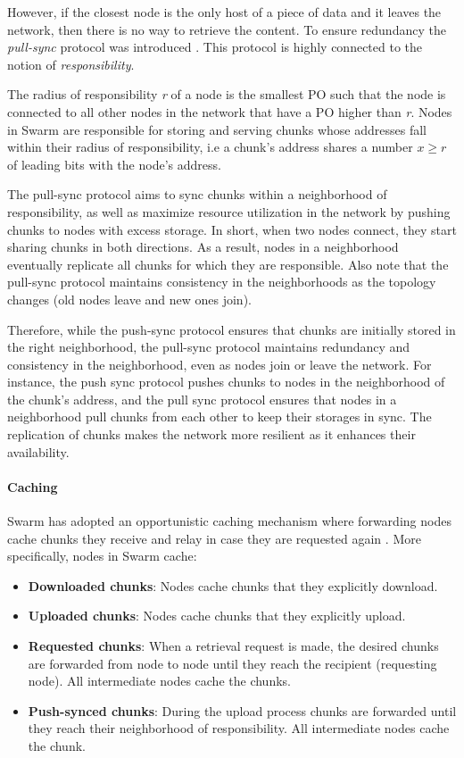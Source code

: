 However, if the closest node is the only host of a piece of data and it leaves the network, then there is no way to retrieve the content. To ensure redundancy the \textit{pull-sync} protocol was introduced \citep{swarm_team_2021}. This protocol is highly connected to the notion of \textit{responsibility}.

The radius of responsibility \textit{r} of a node is the smallest PO such that the node is connected to all other nodes in the network that have a PO higher than \textit{r}. Nodes in Swarm are responsible for storing and serving chunks whose addresses fall within their radius of responsibility, i.e a chunk's address shares a number $x \geq r$ of leading bits with the node's address.

The pull-sync protocol aims to sync chunks within a neighborhood of responsibility, as well as maximize resource utilization in the network by pushing chunks to nodes with excess storage. In short, when two nodes connect, they start sharing chunks in both directions. As a result, nodes in a neighborhood eventually replicate all chunks for which they are responsible. Also note that the pull-sync protocol maintains consistency in the neighborhoods as the topology changes (old nodes leave and new ones join).

Therefore, while the push-sync protocol ensures that chunks are initially stored in the right neighborhood, the pull-sync protocol maintains redundancy and consistency in the neighborhood, even as nodes join or leave the network. For instance, the push sync protocol pushes chunks to nodes in the neighborhood of the chunk's address, and the pull sync protocol ensures that nodes in a neighborhood pull chunks from each other to keep their storages in sync. The replication of chunks makes the network more resilient as it enhances their availability.

\paragraph{Caching}\label{par:caching_swarm}
Swarm has adopted an opportunistic caching mechanism where forwarding nodes cache chunks they receive and relay in case they are requested again \citep[p.~47]{tron_2020}. More specifically, nodes in Swarm cache:

\begin{itemize}
    \item \textbf{Downloaded chunks}: Nodes cache chunks that they explicitly download.
    \item \textbf{Uploaded chunks}: Nodes cache chunks that they explicitly upload.
    \item \textbf{Requested chunks}: When a retrieval request is made, the desired chunks are forwarded from node to node until they reach the recipient (requesting node). All intermediate nodes cache the chunks.
    \item \textbf{Push-synced chunks}: During the upload process chunks are forwarded until they reach their neighborhood of responsibility. All intermediate nodes cache the chunk.
\end{itemize} 

